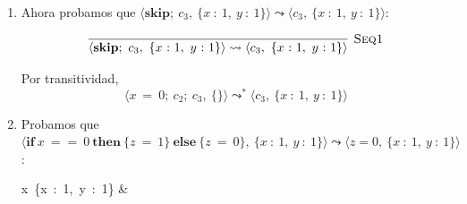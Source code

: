 \documentclass[12pt, a4paper]{article}
\begin{document}
\begin{enumerate}[leftmargin=*]
Combinando con el resultado anterior:

\[
\begin{adjustbox}{max width=\textwidth}
\infer[\textsc{Trans}]
  {\langle x\ {=}\ 0;\ c_2;\ c_3,\ \{\}\rangle \leadsto^{*} \langle \mathbf{skip};\ c_3,\ \{x\ {:}\ 1,\ y\ {:}\ 1\}\rangle}
  {
    \langle x\ {=}\ 0;\ c_2;\ c_3,\ \{\}\rangle \leadsto^{*} \langle y\ {=}\ x{+}{+};\ c_3,\ \{x\ {:}\ 0\}\rangle
    &
    \langle y\ {=}\ x{+}{+};\ c_3,\ \{x\ {:}\ 0\}\rangle \leadsto^{*} \langle \mathbf{skip};\ c_3,\ \{x\ {:}\ 1,\ y\ {:}\ 1\}\rangle
  }
\end{adjustbox}
\]

concluimos:
\[
\langle x\ {=}\ 0;\ c_2;\ c_3,\ \{\}\rangle \leadsto^{*} \langle \mathbf{skip};\ c_3,\ \{x\ {:}\ 1,\ y\ {:}\ 1\}\rangle
\]

\item Ahora probamos que $\langle \mathbf{skip};\ c_3,\ \{x\ {:}\ 1,\ y\ {:}\ 1\}\rangle \leadsto \langle c_3,\ \{x\ {:}\ 1,\ y\ {:}\ 1\}\rangle$:

\[
\infer[\textsc{Seq1}]
  {\langle \mathbf{skip};\ c_3,\ \{x\ {:}\ 1,\ y\ {:}\ 1\}\rangle \leadsto \langle c_3,\ \{x\ {:}\ 1,\ y\ {:}\ 1\}\rangle}
  {}
\]

Por transitividad,
\[
\langle x\ {=}\ 0;\ c_2;\ c_3,\ \{\}\rangle \leadsto^{*} \langle c_3,\ \{x\ {:}\ 1,\ y\ {:}\ 1\}\rangle
\]

\item Probamos que $\langle \mathbf{if}\ x\ {==}\ 0\ \mathbf{then}\ \{z\ {=}\ 1\}\ \mathbf{else}\ \{z\ {=}\ 0\},\ \{x\ {:}\ 1,\ y\ {:}\ 1\}\rangle \leadsto \langle z{=}0,\ \{x\ {:}\ 1,\ y\ {:}\ 1\}\rangle$:

\begin{center}
  {
    {
      {x \in {}\,\{x\ {:}\ 1,\ y\ {:}\ 1\}}
     &
       {}}}
\end{center}


\end{enumerate}
\end{document}
